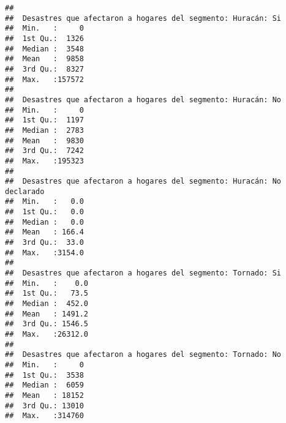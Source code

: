 \documentclass[11pt,]{article}
\begin{document}
\begin{verbatim}
##                                                                      
##  Desastres que afectaron a hogares del segmento: Huracán: Si
##  Min.   :     0                                             
##  1st Qu.:  1326                                             
##  Median :  3548                                             
##  Mean   :  9858                                             
##  3rd Qu.:  8327                                             
##  Max.   :157572                                             
##                                                             
##  Desastres que afectaron a hogares del segmento: Huracán: No
##  Min.   :     0                                             
##  1st Qu.:  1197                                             
##  Median :  2783                                             
##  Mean   :  9830                                             
##  3rd Qu.:  7242                                             
##  Max.   :195323                                             
##                                                             
##  Desastres que afectaron a hogares del segmento: Huracán: No declarado
##  Min.   :   0.0                                                       
##  1st Qu.:   0.0                                                       
##  Median :   0.0                                                       
##  Mean   : 166.4                                                       
##  3rd Qu.:  33.0                                                       
##  Max.   :3154.0                                                       
##                                                                       
##  Desastres que afectaron a hogares del segmento: Tornado: Si
##  Min.   :    0.0                                            
##  1st Qu.:   73.5                                            
##  Median :  452.0                                            
##  Mean   : 1491.2                                            
##  3rd Qu.: 1546.5                                            
##  Max.   :26312.0                                            
##                                                             
##  Desastres que afectaron a hogares del segmento: Tornado: No
##  Min.   :     0                                             
##  1st Qu.:  3538                                             
##  Median :  6059                                             
##  Mean   : 18152                                             
##  3rd Qu.: 13010                                             
##  Max.   :314760                                             

\end{verbatim}
\end{document}
